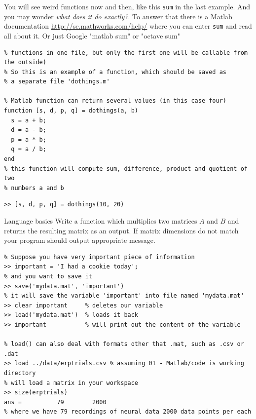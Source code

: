 \documentclass[a4paper,11pt]{article}
\begin{document}
You will see weird functions now and then, like this \texttt{sum} in the last example. And you may wonder \emph{what does it do exactly?}. To answer that there is a Matlab documentation \url{http://se.mathworks.com/help/} where you can enter \texttt{sum} and read all about it. Or just Google "matlab sum" or "octave sum"

\begin{lstlisting}[caption = {Creating a function, file \texttt{dothings.m}}]
% Each function in Matlab lives in a separate file (you can have several
% functions in one file, but only the first one will be callable from the outside)
% So this is an example of a function, which should be saved as
% a separate file 'dothings.m'

% Matlab function can return several values (in this case four)
function [s, d, p, q] = dothings(a, b)
  s = a + b;
  d = a - b;
  p = a * b;
  q = a / b;
end
% this function will compute sum, difference, product and quotient of two
% numbers a and b
\end{lstlisting}

\begin{lstlisting}[caption = {Calling a function}]
% Now once we have our function defined and saved we can call it
>> [s, d, p, q] = dothings(10, 20)
\end{lstlisting}


%
%
\begin{exercise}{1}{Language basics}{}
Write a function which multiplies two matrices $A$ and $B$ and returns the resulting matrix as an output. If matrix dimensions do not match your program should output appropriate message.
\end{exercise}


%
%
\begin{lstlisting}[caption={Working with data},label={lst:data}]
% There are two great functions in Matlab: 'save' and 'load'.
% Suppose you have very important piece of information
>> important = 'I had a cookie today';
% and you want to save it
>> save('mydata.mat', 'important')
% it will save the variable 'important' into file named 'mydata.mat'
>> clear important     % deletes our variable
>> load('mydata.mat')  % loads it back
>> important           % will print out the content of the variable

% load() can also deal with formats other that .mat, such as .csv or .dat
>> load ../data/erptrials.csv % assuming 01 - Matlab/code is working directory
% will load a matrix in your workspace
>> size(erptrials)
ans =          79        2000
% where we have 79 recordings of neural data 2000 data points per each
\end{lstlisting}
\end{document}
